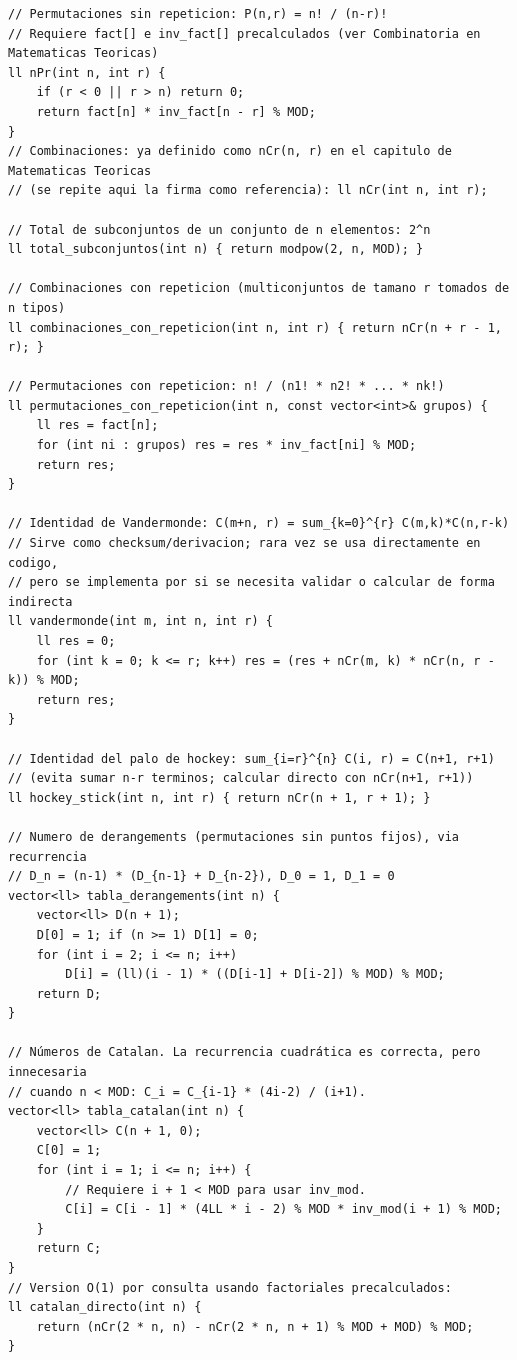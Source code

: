 \documentclass[10pt,twocolumn,letterpaper]{report}
\begin{document}
\begin{lstlisting}
// Permutaciones sin repeticion: P(n,r) = n! / (n-r)!
// Requiere fact[] e inv_fact[] precalculados (ver Combinatoria en Matematicas Teoricas)
ll nPr(int n, int r) {
    if (r < 0 || r > n) return 0;
    return fact[n] * inv_fact[n - r] % MOD;
}
// Combinaciones: ya definido como nCr(n, r) en el capitulo de Matematicas Teoricas
// (se repite aqui la firma como referencia): ll nCr(int n, int r);

// Total de subconjuntos de un conjunto de n elementos: 2^n
ll total_subconjuntos(int n) { return modpow(2, n, MOD); }

// Combinaciones con repeticion (multiconjuntos de tamano r tomados de n tipos)
ll combinaciones_con_repeticion(int n, int r) { return nCr(n + r - 1, r); }

// Permutaciones con repeticion: n! / (n1! * n2! * ... * nk!)
ll permutaciones_con_repeticion(int n, const vector<int>& grupos) {
    ll res = fact[n];
    for (int ni : grupos) res = res * inv_fact[ni] % MOD;
    return res;
}

// Identidad de Vandermonde: C(m+n, r) = sum_{k=0}^{r} C(m,k)*C(n,r-k)
// Sirve como checksum/derivacion; rara vez se usa directamente en codigo,
// pero se implementa por si se necesita validar o calcular de forma indirecta
ll vandermonde(int m, int n, int r) {
    ll res = 0;
    for (int k = 0; k <= r; k++) res = (res + nCr(m, k) * nCr(n, r - k)) % MOD;
    return res;
}

// Identidad del palo de hockey: sum_{i=r}^{n} C(i, r) = C(n+1, r+1)
// (evita sumar n-r terminos; calcular directo con nCr(n+1, r+1))
ll hockey_stick(int n, int r) { return nCr(n + 1, r + 1); }

// Numero de derangements (permutaciones sin puntos fijos), via recurrencia
// D_n = (n-1) * (D_{n-1} + D_{n-2}), D_0 = 1, D_1 = 0
vector<ll> tabla_derangements(int n) {
    vector<ll> D(n + 1);
    D[0] = 1; if (n >= 1) D[1] = 0;
    for (int i = 2; i <= n; i++)
        D[i] = (ll)(i - 1) * ((D[i-1] + D[i-2]) % MOD) % MOD;
    return D;
}

// Números de Catalan. La recurrencia cuadrática es correcta, pero innecesaria
// cuando n < MOD: C_i = C_{i-1} * (4i-2) / (i+1).
vector<ll> tabla_catalan(int n) {
    vector<ll> C(n + 1, 0);
    C[0] = 1;
    for (int i = 1; i <= n; i++) {
        // Requiere i + 1 < MOD para usar inv_mod.
        C[i] = C[i - 1] * (4LL * i - 2) % MOD * inv_mod(i + 1) % MOD;
    }
    return C;
}
// Version O(1) por consulta usando factoriales precalculados:
ll catalan_directo(int n) {
    return (nCr(2 * n, n) - nCr(2 * n, n + 1) % MOD + MOD) % MOD;
}
\end{lstlisting}
\end{document}
